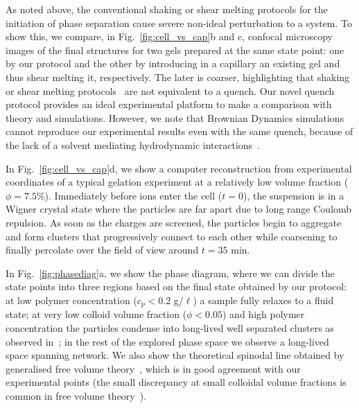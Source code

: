 \documentclass[preprint,footinbib,amsmath,amssymb]{revtex4}
\begin{document}
As noted above, the conventional shaking or shear melting protocols for the initiation of phase separation cause severe non-ideal perturbation to a system. To show this,  
we compare, in Fig.~\ref{fig:cell_vs_cap}b and c, confocal microscopy images of the final structures for two gels prepared at the same state point: one by our protocol and the other by introducing in a capillary an existing gel and thus shear melting it, respectively. The later is coarser, highlighting that shaking or shear melting protocols~\cite{lu2008gelation,Teece2011,Bartlett2012} are not equivalent to a quench. 
Our novel quench protocol provides an ideal experimental platform to make a comparison with theory and simulations. However, we note that Brownian Dynamics simulations cannot reproduce our experimental results even with the same quench, because of the lack of a solvent mediating hydrodynamic interactions~\cite{tanaka2000simulation,Furukawa2010}. 

In Fig.~\ref{fig:cell_vs_cap}d, we show a computer reconstruction from experimental coordinates of a typical gelation experiment at a relatively low volume fraction ($\phi=7.5\%$). Immediately before ions enter the cell ($t=0$), the suspension is in a Wigner crystal state where the particles are far apart due to long range Coulomb repulsion. As soon as the charges are screened, the particles begin to aggregate and form clusters that progressively connect to each other while coarsening to finally percolate over the field of view around $t=35$ min.


In Fig.~\ref{fig:phasediag}a, we show the phase diagram, where we can divide the state points into three regions based on the final state obtained by our protocol: at low polymer concentration ($c_p<0.2$ g/$\ell$) a sample fully relaxes to a fluid state; at very low colloid volume fraction ($\phi<0.05$) and high polymer concentration the particles condense into long-lived well separated clusters as observed in~\cite{Lu2006}; in the rest of the explored phase space we observe a long-lived space spanning network. 
We also show the theoretical spinodal line obtained by generalised free volume theory~\cite{Fleer2008}, which is in good agreement with our experimental points 
(the small discrepancy at small colloidal volume fractions is common in free volume theory~\cite{Shah2003,Bergenholtz2003,lu2008gelation}). 
\end{document}
